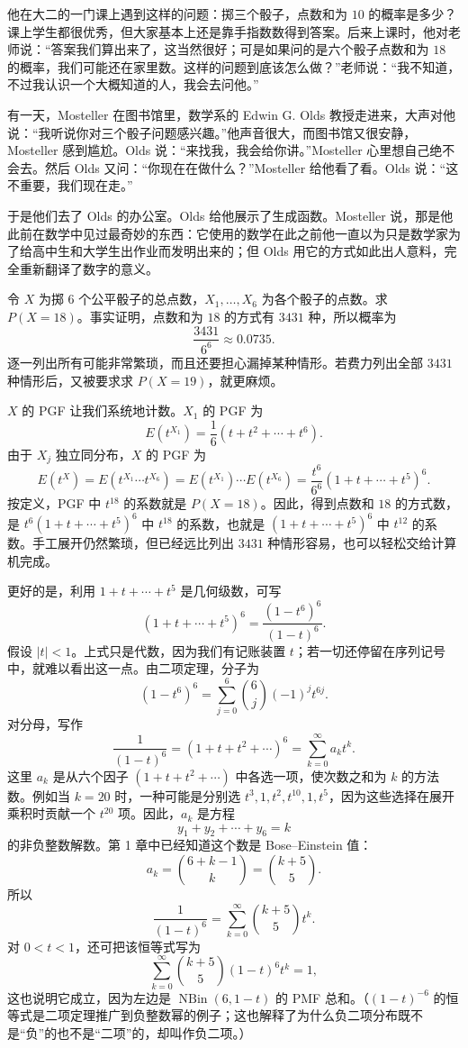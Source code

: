 \documentclass[UTF8,12pt,a4paper,fontset=fandol]{ctexart}
\begin{document}
他在大二的一门课上遇到这样的问题：掷三个骰子，点数和为 $10$ 的概率是多少？课上学生都很优秀，但大家基本上还是靠手指数数得到答案。后来上课时，他对老师说：“答案我们算出来了，这当然很好；可是如果问的是六个骰子点数和为 $18$ 的概率，我们可能还在家里数。这样的问题到底该怎么做？”老师说：“我不知道，不过我认识一个大概知道的人，我会去问他。”

有一天，Mosteller 在图书馆里，数学系的 Edwin G. Olds 教授走进来，大声对他说：“我听说你对三个骰子问题感兴趣。”他声音很大，而图书馆又很安静，Mosteller 感到尴尬。Olds 说：“来找我，我会给你讲。”Mosteller 心里想自己绝不会去。然后 Olds 又问：“你现在在做什么？”Mosteller 给他看了看。Olds 说：“这不重要，我们现在走。”

于是他们去了 Olds 的办公室。Olds 给他展示了生成函数。Mosteller 说，那是他此前在数学中见过最奇妙的东西：它使用的数学在此之前他一直以为只是数学家为了给高中生和大学生出作业而发明出来的；但 Olds 用它的方式如此出人意料，完全重新翻译了数字的意义。

令 $X$ 为掷 $6$ 个公平骰子的总点数，$X_1,\ldots,X_6$ 为各个骰子的点数。求 $P(X=18)$。事实证明，点数和为 $18$ 的方式有 $3431$ 种，所以概率为
\[
  \frac{3431}{6^6}\approx0.0735.
\]
逐一列出所有可能非常繁琐，而且还要担心漏掉某种情形。若费力列出全部 $3431$ 种情形后，又被要求求 $P(X=19)$，就更麻烦。

$X$ 的 PGF 让我们系统地计数。$X_1$ 的 PGF 为
\[
  E(t^{X_1})=\frac16(t+t^2+\cdots+t^6).
\]
由于 $X_j$ 独立同分布，$X$ 的 PGF 为
\[
  E(t^X)=E(t^{X_1}\cdots t^{X_6})
  =
  E(t^{X_1})\cdots E(t^{X_6})
  =
  \frac{t^6}{6^6}(1+t+\cdots+t^5)^6.
\]
按定义，PGF 中 $t^{18}$ 的系数就是 $P(X=18)$。因此，得到点数和 $18$ 的方式数，是 $t^6(1+t+\cdots+t^5)^6$ 中 $t^{18}$ 的系数，也就是 $(1+t+\cdots+t^5)^6$ 中 $t^{12}$ 的系数。手工展开仍然繁琐，但已经远比列出 $3431$ 种情形容易，也可以轻松交给计算机完成。

更好的是，利用 $1+t+\cdots+t^5$ 是几何级数，可写
\[
  (1+t+\cdots+t^5)^6=\frac{(1-t^6)^6}{(1-t)^6}.
\]
假设 $|t|<1$。上式只是代数，因为我们有记账装置 $t$；若一切还停留在序列记号中，就难以看出这一点。由二项定理，分子为
\[
  (1-t^6)^6=\sum_{j=0}^6\binom{6}{j}(-1)^jt^{6j}.
\]
对分母，写作
\[
  \frac1{(1-t)^6}=(1+t+t^2+\cdots)^6=\sum_{k=0}^{\infty}a_kt^k.
\]
这里 $a_k$ 是从六个因子 $(1+t+t^2+\cdots)$ 中各选一项，使次数之和为 $k$ 的方法数。例如当 $k=20$ 时，一种可能是分别选 $t^3,1,t^2,t^{10},1,t^5$，因为这些选择在展开乘积时贡献一个 $t^{20}$ 项。因此，$a_k$ 是方程
\[
  y_1+y_2+\cdots+y_6=k
\]
的非负整数解数。第 1 章中已经知道这个数是 Bose--Einstein 值：
\[
  a_k=\binom{6+k-1}{k}=\binom{k+5}{5}.
\]
所以
\[
  \frac1{(1-t)^6}=\sum_{k=0}^{\infty}\binom{k+5}{5}t^k.
\]
对 $0<t<1$，还可把该恒等式写为
\[
  \sum_{k=0}^{\infty}\binom{k+5}{5}(1-t)^6t^k=1,
\]
这也说明它成立，因为左边是 $\operatorname{NBin}(6,1-t)$ 的 PMF 总和。（$(1-t)^{-6}$ 的恒等式是二项定理推广到负整数幂的例子；这也解释了为什么负二项分布既不是“负”的也不是“二项”的，却叫作负二项。）
\end{document}
